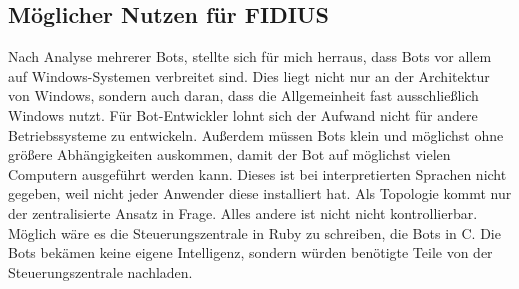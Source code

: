 \subsection{Möglicher Nutzen für FIDIUS}
Nach Analyse mehrerer Bots, stellte sich für mich herraus, dass Bots vor allem
auf Windows-Systemen verbreitet sind. Dies liegt nicht nur an der Architektur
von Windows, sondern auch daran, dass die Allgemeinheit fast ausschließlich
Windows nutzt. Für Bot-Entwickler lohnt sich der Aufwand nicht für andere
Betriebssysteme zu entwickeln. Außerdem müssen Bots klein und möglichst ohne
größere Abhängigkeiten auskommen, damit der Bot auf möglichst vielen Computern
ausgeführt werden kann. Dieses ist bei interpretierten Sprachen nicht gegeben,
weil nicht jeder Anwender diese installiert hat. Als Topologie kommt nur der
zentralisierte Ansatz in Frage. Alles andere ist nicht nicht kontrollierbar.
Möglich wäre es die Steuerungszentrale in Ruby zu schreiben, die Bots in C.
Die Bots bekämen keine eigene Intelligenz, sondern würden benötigte Teile von
der Steuerungszentrale nachladen.


